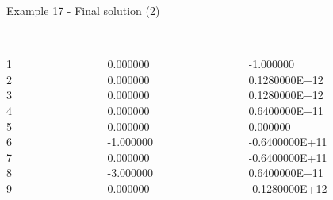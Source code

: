 \begin{frame}{Example 17 - Final solution (2)}
\footnotesize

\begin{columns}[t]
\begin{column}{0.3\textwidth}
\\
1\\
2\\
3\\
4\\
5\\
6\\
7\\
8\\
9\\
\end{column}
\begin{column}{0.3\textwidth}
\\
0.000000\\
0.000000\\
0.000000\\
0.000000\\
0.000000\\
-1.000000\\
0.000000\\
-3.000000\\
0.000000\\
\end{column}

\begin{column}{0.3\textwidth}
\\
-1.000000\\
0.1280000E+12\\
0.1280000E+12\\
0.6400000E+11\\
0.000000\\
-0.6400000E+11\\
-0.6400000E+11\\
0.6400000E+11\\
-0.1280000E+12\\
\end{column}
\end{columns}
\end{frame}

